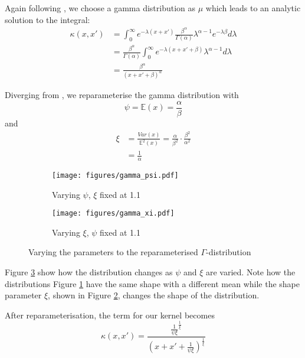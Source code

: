 \documentclass[a4paper,12pt,twoside,openright]{report}
\begin{document}
Again following \cite{2014arXiv1406.3896S}, we choose a gamma distribution as $\mu$ which leads to an analytic solution to the integral:
\begin{align}
\kappa(x, x') &= \int_0^{\infty} e^{-\lambda(x+x')}\frac{\beta^\alpha}{\Gamma(\alpha)}\lambda^{\alpha -1}e^{-\lambda\beta} d\lambda\\
&=\frac{\beta^\alpha}{\Gamma(\alpha)}\int_0^\infty e^{-\lambda(x+x'+\beta)}\lambda^{\alpha-1}d\lambda\\
&=\frac{\beta^\alpha}{(x+x'+\beta)^\alpha}
\end{align}

Diverging from \cite{2014arXiv1406.3896S}, we reparameterise the gamma distribution with
\begin{equation}
\psi = \mathbb{E}(x) = \frac{\alpha}{\beta}
\end{equation}
and
\begin{align}
\xi &= \frac{Var(x)}{\mathbb{E}^2 (x)} = \frac{\alpha}{\beta^2} \cdot \frac{\beta^2}{\alpha^2}\\
&= \frac{1}{\alpha}
\end{align}

\begin{figure}
\centering
\begin{subfigure}{.5\textwidth}
  \centering
  \texttt{[image: figures/gamma\_psi.pdf]}
  \caption{Varying $\psi$, $\xi$ fixed at 1.1}
  \label{gammapsi}
\end{subfigure}%
\begin{subfigure}{.5\textwidth}
  \centering
  \texttt{[image: figures/gamma\_xi.pdf]}
  \caption{Varying $\xi$, $\psi$ fixed at 1.1}
  \label{gammaxi}
\end{subfigure}
\caption{Varying the parameters to the reparameterised $\Gamma$-distribution}
\label{gammadist}
\end{figure}


Figure \ref{gammadist} show how the distribution changes as $\psi$ and $\xi$ are varied. Note how the distributions Figure \ref{gammapsi} have the same shape with a different mean while the shape parameter $\xi$, shown in Figure \ref{gammaxi}, changes the shape of the distribution.

After reparameterisation, the term for our kernel becomes
\begin{equation}
\kappa(x, x') = \frac{\frac{1}{\psi\xi}^{\frac{1}{\xi}}}{(x+x'+\frac{1}{\psi\xi})^{\frac{1}{\xi}}}
\end{equation}
\end{document}

